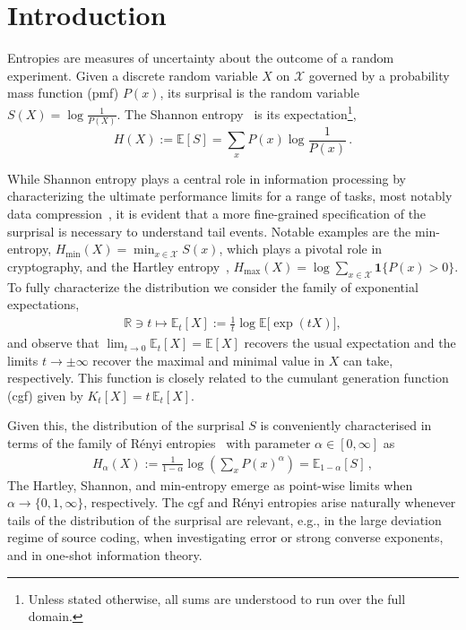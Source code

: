 \documentclass[aps,pra,11pt,onecolumn,nofootinbib,tightenlines]{revtex4-2}
\theoremstyle{definition}
\newcommand{\mc}[1]{\mathcal{#1}}
\newcommand{\mb}[1]{\mathbb{#1}}
\begin{document}
\endgroup

\tableofcontents 

\section{Introduction}

Entropies are measures of uncertainty about the outcome of a random experiment. Given a discrete random variable $X$ on $\mc{X}$ governed by a probability mass function (pmf) $P(x)$, its surprisal is the random variable $S(X) = \log \frac{1}{P(X)}$. The Shannon entropy~\cite{shannon1948mathematical} is its expectation\footnote{Unless stated otherwise, all sums are understood to run over the full domain.},
\begin{equation}
    H(X) := \mb{E}[S] = \sum_{x} P(x) \log \frac{1}{P(x)} \,.
\end{equation}

While Shannon entropy plays a central role in information processing by characterizing the ultimate performance limits for a range of tasks, most notably data compression~\cite{shannon1948mathematical}, it is evident that a more fine-grained specification of the surprisal is necessary to understand tail events. Notable examples are the min-entropy, $H_{\min}(X) = \min_{x \in \mc{X}} S(x)$, which plays a pivotal role in cryptography, and the Hartley entropy~\cite{hartley28}, $H_{\max}(X) = \log \sum_{x \in \mc{X}} \mathbf{1}\{ P(x) > 0\}$. To fully characterize the distribution we consider the family of exponential expectations,
\begin{align}
  \mathbb{R} \ni  t \mapsto \mb{E}_t[X] := \frac{1}{t} \log \mb{E}\big[ \exp(t X) \big], 
\end{align}
and observe that $\lim_{t \to 0} \mb{E}_t[X] = \mb{E}[X]$ recovers the usual expectation and the limits $t \to \pm \infty$ recover the maximal and minimal value in $X$ can take, respectively. This function is closely related to the cumulant generation function (cgf) given by $K_t[X] = t\,\mb{E}_t[X]$.

Given this, the distribution of the surprisal $S$ is conveniently characterised in terms of the family of Rényi entropies~\cite{renyi61} with parameter $\alpha \in [0, \infty]$ as
\begin{align}
    H_{\alpha}(X) := \frac{1}{1-\alpha} \log \left( \sum_{x} P(x)^{\alpha} \right) = \mb{E}_{1-\alpha}[S] \,,
\end{align}
The Hartley, Shannon, and min-entropy emerge as point-wise limits when $\alpha \to \{0, 1, \infty\}$, respectively. 
The cgf and Rényi entropies arise naturally whenever tails of the distribution of the surprisal are relevant, e.g., in the large deviation regime of source coding, when investigating error or strong converse exponents, and in one-shot information theory.
\end{document}
